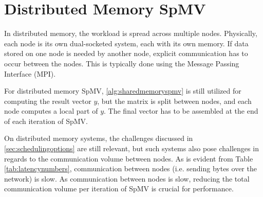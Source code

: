



\section{Distributed Memory SpMV}

In distributed memory, the workload is spread across multiple nodes. Physically, each node is its own dual-socketed system, each with its own memory. If data stored on one node is needed by another node, explicit communication has to occur between the nodes. This is typically done using the Message Passing Interface (MPI).
\medskip

For distributed memory SpMV, \autoref{alg:sharedmemoryspmv} is still utilized for computing the result vector \(y\), but the matrix is split between nodes, and each node computes a local part of \(y\). The final vector has to be assembled at the end of each iteration of SpMV. 
\medskip

On distributed memory systems, the challenges discussed in \ref{sec:schedulingoptions} are still relevant, but such systems also pose challenges in regards to the communication volume between nodes. As is evident from Table \ref{tab:latencynumbers}, communication between nodes (i.e. sending bytes over the network) is slow. As communication between nodes is slow, reducing the total communication volume per iteration of SpMV is crucial for performance.

